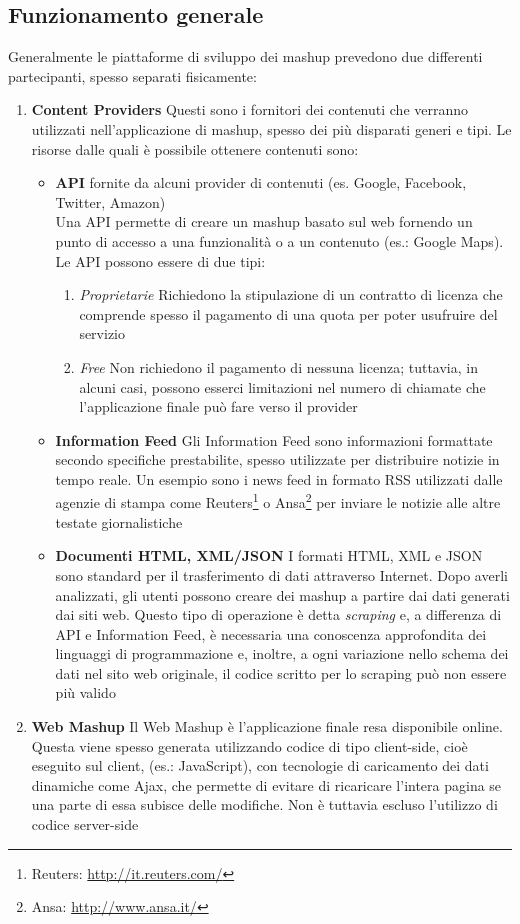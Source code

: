 \subsection{Funzionamento generale\label{sec:mashup-operations}}
Generalmente le piattaforme di sviluppo dei mashup prevedono due differenti partecipanti, spesso separati fisicamente:
\begin{enumerate}
	\item \textbf{Content Providers} Questi sono i fornitori dei contenuti che verranno utilizzati nell'applicazione di mashup, spesso dei più disparati generi e tipi.
	Le risorse dalle quali è possibile ottenere contenuti sono:
	\begin{itemize}
		\item \textbf{API} fornite da alcuni provider di contenuti (es. Google, Facebook, Twitter, Amazon)\\
		Una API permette di creare un mashup basato sul web fornendo un punto di accesso a una funzionalità o a un contenuto (es.: Google Maps).
		Le API possono essere di due tipi:
		\begin{enumerate}
			\item \emph{Proprietarie} Richiedono la stipulazione di un contratto di licenza che comprende spesso il pagamento di una quota per poter usufruire del servizio
			\item \emph{Free} Non richiedono il pagamento di nessuna licenza; tuttavia, in alcuni casi, possono esserci limitazioni nel numero di chiamate che l'applicazione finale può fare verso il provider
		\end{enumerate} 
		\item \textbf{Information Feed} Gli Information Feed sono informazioni formattate secondo specifiche prestabilite, spesso utilizzate per distribuire notizie in tempo reale. Un esempio sono i news feed in formato RSS utilizzati dalle agenzie di stampa come Reuters\footnote{Reuters: \url{http://it.reuters.com/}} o Ansa\footnote{Ansa: \url{http://www.ansa.it/}} per inviare le notizie alle altre testate giornalistiche
		\item \textbf{Documenti HTML, XML/JSON} I formati HTML, XML e JSON sono standard per il trasferimento di dati attraverso Internet. Dopo averli analizzati, gli utenti possono creare dei mashup a partire dai dati generati dai siti web. Questo tipo di operazione è detta \emph{scraping} e, a differenza di API e Information Feed, è necessaria una conoscenza approfondita dei linguaggi di programmazione e, inoltre, a ogni variazione nello schema dei dati nel sito web originale, il codice scritto per lo scraping può non essere più valido
	\end{itemize} 
	\item \textbf{Web Mashup}
	Il Web Mashup è l'applicazione finale resa disponibile online. Questa viene spesso generata utilizzando codice di tipo client-side, cioè eseguito sul client, (es.: JavaScript), con tecnologie di caricamento dei dati dinamiche come Ajax, che permette di evitare di ricaricare l'intera pagina se una parte di essa subisce delle modifiche. Non è tuttavia escluso l'utilizzo di codice server-side
\end{enumerate}

